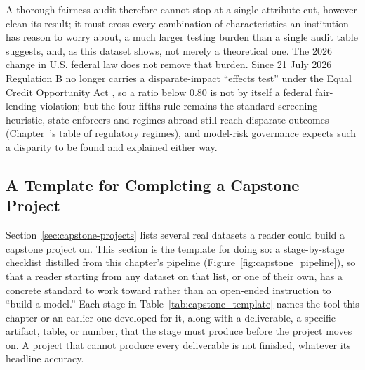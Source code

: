 \documentclass[../ai_in_finance]{subfiles}
\begin{document}
A thorough fairness audit therefore cannot stop at a single-attribute cut, however clean its result; it must cross every combination of characteristics an institution has reason to worry about, a much larger testing burden than a single audit table suggests, and, as this dataset shows, not merely a theoretical one. The 2026 change in U.S. federal law does not remove that burden. Since 21 July 2026 Regulation B no longer carries a disparate-impact ``effects test'' under the Equal Credit Opportunity Act \parencite{cfpb2026regb}, so a ratio below 0.80 is not by itself a federal fair-lending violation; but the four-fifths rule remains the standard screening heuristic, state enforcers and regimes abroad still reach disparate outcomes (Chapter~'s table of regulatory regimes), and model-risk governance expects such a disparity to be found and explained either way.

\subsection{A Template for Completing a Capstone Project}
\label{sec:capstone-template}

Section~\ref{sec:capstone-projects} lists several real datasets a reader could build a capstone project on. This section is the template for doing so: a stage-by-stage checklist distilled from this chapter's pipeline (Figure~\ref{fig:capstone_pipeline}), so that a reader starting from any dataset on that list, or one of their own, has a concrete standard to work toward rather than an open-ended instruction to ``build a model.'' Each stage in Table~\ref{tab:capstone_template} names the tool this chapter or an earlier one developed for it, along with a deliverable, a specific artifact, table, or number, that the stage must produce before the project moves on. A project that cannot produce every deliverable is not finished, whatever its headline accuracy.
\end{document}
